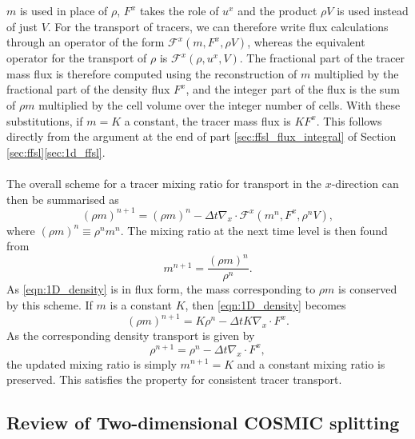 \documentclass{ametsocV6.1}
\begin{document}
$m$ is used in place of $\rho$, $F^x$ takes the role of $u^x$ and the product $\rho V$ is used instead of just $V$.
For the transport of tracers, we can therefore write flux calculations through an operator of the form $\mathcal{F}^x(m,F^x,\rho V)$, whereas the equivalent operator for the transport of $\rho$ is $\mathcal{F}^x(\rho,u^x,V)$.
The fractional part of the tracer mass flux is therefore computed using the reconstruction of $m$ multiplied by the fractional part of the density flux $F^x$, and the integer part of the flux is the sum of $\rho m$ multiplied by the cell volume over the integer number of cells.
With these substitutions, if $m=K$ a constant, the tracer mass flux is $KF^x$. This follows directly from the argument at the end of part \ref{sec:ffsl_flux_integral} of Section \ref{sec:ffsl}\ref{sec:1d_ffsl}. \\
\\
The overall scheme for a tracer mixing ratio for transport in the $x$-direction can then be summarised as
\begin{equation} \label{eqn:1D_density}
(\rho m)^{n+1} = (\rho m)^n - \Delta t \nabla_x\cdot \mathcal{F}^x(m^n,F^x,\rho^nV),
\end{equation}
where $(\rho m)^n\equiv \rho^n m^n$.
The mixing ratio at the next time level is then found from
\begin{equation}
m^{n+1} = \frac{(\rho m)^n}{\rho^n}.
\end{equation}
As \eqref{eqn:1D_density} is in flux form, the mass corresponding to $\rho m$ is conserved by this scheme.
If $m$ is a constant $K$, then \eqref{eqn:1D_density} becomes
\begin{equation}
(\rho m)^{n+1} = K\rho^n - \Delta t K \nabla_x\cdot F^x.
\end{equation}
As the corresponding density transport is given by
\begin{equation}
\rho^{n+1} = \rho^n - \Delta t \nabla_x \cdot F^x,
\end{equation}
the updated mixing ratio is simply $m^{n+1}=K$ and a constant mixing ratio is preserved. This satisfies the property for consistent tracer transport.

\subsection{Review of Two-dimensional COSMIC splitting} \label{sec:cosmic}
\end{document}
